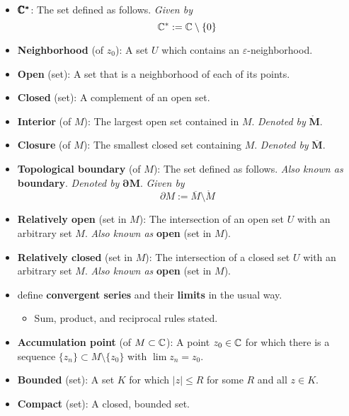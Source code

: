 \documentclass[../notes.tex]{subfiles}
\begin{document}
\begin{itemize}
\begin{equation*}
    \end{equation*}
    \item $\bm{\pmb{\mathbb{C}}^*}$: The set defined as follows. \emph{Given by}
    \begin{equation*}
        \mathbb{C}^* := \mathbb{C}\setminus\{0\}
    \end{equation*}
    \item {}\textbf{Neighborhood} (of $z_0$): A set $U$ which contains an $\varepsilon$-neighborhood.
    \item \textbf{Open} (set): A set that is a neighborhood of each of its points.
    \item \textbf{Closed} (set): A complement of an open set.
    \item \textbf{Interior} (of $M$): The largest open set contained in $M$. \emph{Denoted by} $\bm{\mathring{M}}$.
    \item \textbf{Closure} (of $M$): The smallest closed set containing $M$. \emph{Denoted by} $\bm{\overline{M}}$.
    \item \textbf{Topological boundary} (of $M$): The set defined as follows. \emph{Also known as} \textbf{boundary}. \emph{Denoted by} $\bm{\partial M}$. \emph{Given by}
    \begin{equation*}
        \partial M := \overline{M}\setminus\mathring{M}
    \end{equation*}
    \item \textbf{Relatively open} (set in $M$): The intersection of an open set $U$ with an arbitrary set $M$. \emph{Also known as} \textbf{open} (set in $M$).
    \item \textbf{Relatively closed} (set in $M$): The intersection of a closed set $U$ with an arbitrary set $M$. \emph{Also known as} \textbf{open} (set in $M$).
    \item {}\textcite{bib:FischerLieb} define \textbf{convergent series} and their \textbf{limits} in the usual way.
    \begin{itemize}
        \item Sum, product, and reciprocal rules stated.
    \end{itemize}
    \item \textbf{Accumulation point} (of $M\subset\mathbb{C}$): A point $z_0\in\mathbb{C}$ for which there is a sequence $\{z_n\}\subset M\setminus\{z_0\}$ with $\lim z_n=z_0$.
    \item \textbf{Bounded} (set): A set $K$ for which $|z|\leq R$ for some $R$ and all $z\in K$.
    \item \textbf{Compact} (set): A closed, bounded set.

\end{itemize}
\end{document}
